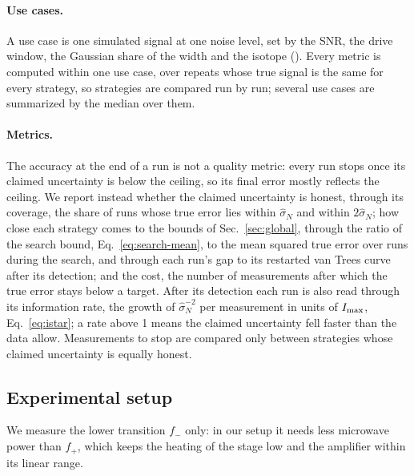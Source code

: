 \paragraph{Use cases.} A use case is one simulated signal at one noise level, set by the SNR, the drive window, the
Gaussian share of the width and the isotope (). Every metric is computed within one use
case, over repeats whose true signal is the same for every strategy, so strategies are compared run by run; several
use cases are summarized by the median over them.

\paragraph{Metrics.} The accuracy at the end of a run is not a quality metric: every run stops once its claimed
uncertainty is below the ceiling, so its final error mostly reflects the ceiling. We report instead whether the
claimed uncertainty is honest, through its coverage, the share of runs whose true error lies within $\hat\sigma_N$
and within $2\hat\sigma_N$; how close each strategy comes to the bounds of Sec.~\ref{sec:global}, through the ratio of
the search bound, Eq.~\eqref{eq:search-mean}, to the mean squared true error over runs during the
search, and through each run's gap to its restarted van Trees curve after its detection; and the cost, the number of
measurements after which the true error stays below a target. After its detection each run is also read through its
information rate, the growth of $\hat\sigma_N^{-2}$ per measurement in units of $I_{\rm max}$, Eq.~\eqref{eq:istar};
a rate above 1 means the claimed uncertainty fell faster than the data allow. Measurements to stop are compared only between strategies whose claimed
uncertainty is equally honest.

\subsection{Experimental setup}
\label{sec:setup}

We measure the lower transition $f_-$ only: in our setup it needs less microwave power than $f_+$, which keeps the
heating of the stage low and the amplifier within its linear range.
